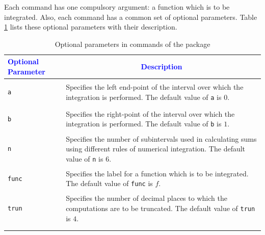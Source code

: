 \documentclass{article}
\begin{document}
Each command has one compulsory argument: a function which is to be integrated. Also, each command has a common set of optional parameters. Table \ref{tbl:optluanum} lists these optional parameters with their description.
\begin{center}
\begin{longtable}{lm{11.3cm}}
\toprule
\multicolumn{1}{l}{\textcolor{blue}{Optional Parameter}} & \multicolumn{1}{c}{\textcolor{blue}{Description}}  \\
\toprule
\begin{lstlisting}[caption={[]}]
a
\end{lstlisting}
 & Specifies the left end-point of the interval over which the integration is performed. The default value of \verb|a| is \(0 \). \\
\midrule
\begin{lstlisting}[caption={[]}]
b
\end{lstlisting}
 &  Specifies the  right-point of the interval over which the integration is performed. The default value of \verb|b| is \(1 \).\\
\midrule
\begin{lstlisting}[caption={[]}]
n
\end{lstlisting}
 & Specifies the number of subintervals used in calculating sums using different rules of numerical integration. The default value of \verb|n| is \(6 \).\\
\midrule
\begin{lstlisting}[caption={[]}]
func
\end{lstlisting}
 & Specifies the label for a function which is to be integrated. The default value of \verb|func| is \(f \). \\
 \midrule
\begin{lstlisting}[caption={[]}]
trun
\end{lstlisting}
 & Specifies the number of decimal places to which the computations are to be truncated. The default value of \verb|trun| is \(4 \). \\
\bottomrule \\
\caption{Optional parameters in commands of the package}
\label{tbl:optluanum}
\end{longtable}
\end{center}
\end{document}

